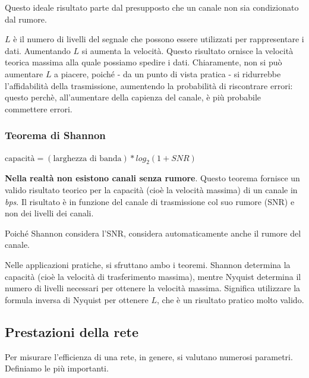             \vspace{3mm}
            
            Questo ideale risultato parte dal presupposto che un canale non sia condizionato dal rumore.
            
            \(L\) è il numero di livelli del segnale che possono essere utilizzati per rappresentare i dati. Aumentando \(L\) si aumenta la velocità. Questo risultato ornisce la velocità teorica massima alla quale possiamo spedire i dati. Chiaramente, non si può aumentare \(L\) a piacere, poiché - da un punto di vista pratica - si ridurrebbe l'affidabilità della trasmissione, aumentendo la probabilità di riscontrare errori: questo perchè, all'aumentare della capienza del canale, è più probabile commettere errori.
        
        \subsubsection{Teorema di Shannon}
        
            \(\text{capacità}=(\text{larghezza di banda})*log_2 (1+SNR)\)
            
            \vspace{3mm}
            
            \textbf{Nella realtà non esistono canali senza rumore}. Questo teorema fornisce un valido risultato teorico per la capacità (cioè la velocità massima) di un canale in \textit{bps}. Il risultato è in funzione del canale di trasmissione col suo rumore (SNR) e non dei livelli dei canali.
            
            Poiché Shannon considera l'SNR, considera automaticamente anche il rumore del canale.
            
        Nelle applicazioni pratiche, si sfruttano ambo i teoremi. Shannon determina la capacità (cioè la velocità di trasferimento massima), mentre Nyquist determina il numero di livelli necessari per ottenere la velocità massima. Significa utilizzare la formula inversa di Nyquist per ottenere \(L\), che è un risultato pratico molto valido.
            
    \subsection{Prestazioni della rete}    
        
        Per misurare l'efficienza di una rete, in genere, si valutano numerosi parametri. Definiamo le più importanti.
        
